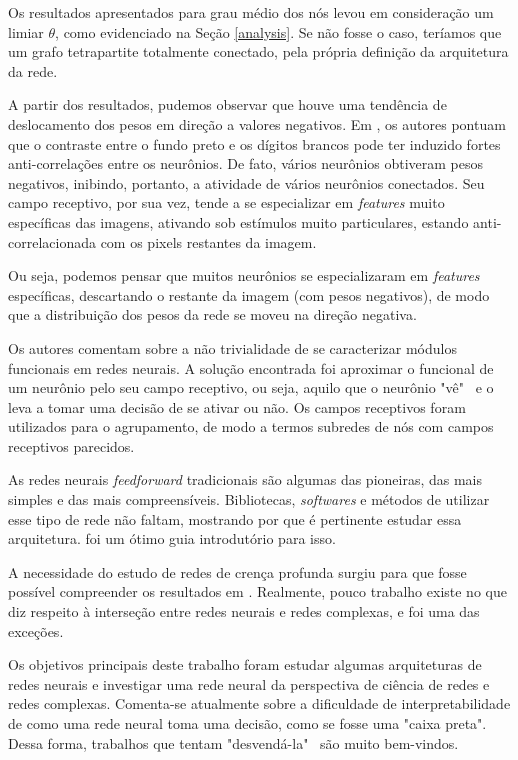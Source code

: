 \documentclass{article}
\begin{document}
        Os resultados apresentados para grau médio dos nós levou em consideração um limiar $\theta$, como evidenciado na Seção \ref{analysis}.
        Se não fosse o caso, teríamos que um grafo tetrapartite totalmente conectado, pela própria definição da arquitetura da rede.

        A partir dos resultados, pudemos observar que houve uma tendência de deslocamento dos pesos em direção a valores negativos.
        Em \cite{testolin2018deep}, os autores pontuam que o contraste entre o fundo preto e os dígitos brancos pode ter induzido fortes anti-correlações entre os neurônios.
        De fato, vários neurônios obtiveram pesos negativos, inibindo, portanto, a atividade de vários neurônios conectados.
        Seu campo receptivo, por sua vez, tende a se especializar em \textit{features} muito específicas das imagens, ativando sob estímulos muito particulares, estando anti-correlacionada com os pixels restantes da imagem.

        Ou seja, podemos pensar que muitos neurônios se especializaram em \textit{features} específicas, descartando o restante da imagem (com pesos negativos), de modo que a distribuição dos pesos da rede se moveu na direção negativa.

        Os autores comentam sobre a não trivialidade de se caracterizar módulos funcionais em redes neurais.
        A solução encontrada foi aproximar o funcional de um neurônio pelo seu campo receptivo, ou seja, aquilo que o neurônio "vê" \ e o leva a tomar uma decisão de se ativar ou não.
        Os campos receptivos foram utilizados para o agrupamento, de modo a termos subredes de nós com campos receptivos parecidos.

        As redes neurais \textit{feedforward} tradicionais são algumas das pioneiras, das mais simples e das mais compreensíveis.
        Bibliotecas, \textit{softwares} e métodos de utilizar esse tipo de rede não faltam, mostrando por que é pertinente estudar essa arquitetura.
        \cite{nielsen2015neural} foi um ótimo guia introdutório para isso.
        
        A necessidade do estudo de redes de crença profunda surgiu para que fosse possível compreender os resultados em \cite{testolin2018deep}.
        Realmente, pouco trabalho existe no que diz respeito à interseção entre redes neurais e redes complexas, e \cite{testolin2018deep} foi uma das exceções.

        Os objetivos principais deste trabalho foram estudar algumas arquiteturas de redes neurais e investigar uma rede neural da perspectiva de ciência de redes e redes complexas.
        Comenta-se atualmente sobre a dificuldade de interpretabilidade de como uma rede neural toma uma decisão, como se fosse uma "caixa preta".
        Dessa forma, trabalhos que tentam "desvendá-la" \ são muito bem-vindos. 

    
    
\end{document}
